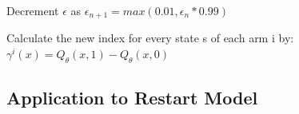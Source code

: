 \documentclass[12pt]{article}
\numberwithin{equation}{section}
\newcommand{\1}{\textbf{1}}
\begin{document}
\begin{algorithm}[H]
\begin{algorithmic}[1]
        \State Decrement $\epsilon$ as $\epsilon_{n+1}=max(0.01,\epsilon_{n}*0.99)$
                
        
    \EndFor
    \State Calculate the new index for every state s of each arm i by:
        \Statex\hspace*{5mm} $\gamma^i(x)=Q_{\theta}(x,1)-Q_{\theta}(x,0)$
\end{algorithmic}
\end{algorithm}


\subsection{Application to Restart Model}
\label{sec:restart}
\end{document}

